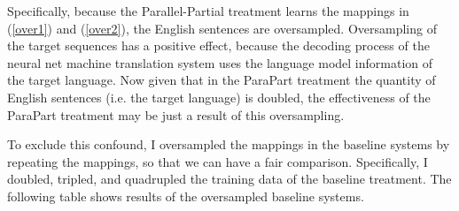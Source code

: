 \documentclass[final]{ua-thesis}
\numberwithin{equation}{section}
\begin{document}
Specifically, because the Parallel-Partial treatment learns the mappings in (\ref{over1}) and (\ref{over2}), the English sentences are oversampled. Oversampling of the target sequences has a positive effect, because the decoding process of the neural net machine translation system uses the language model information of the target language. Now given that in the ParaPart treatment the quantity of English sentences (i.e. the target language) is doubled, the effectiveness of the ParaPart treatment may be just a result of this oversampling.   

To exclude this confound, I oversampled the mappings in the baseline systems by repeating the mappings, so that we can have a fair comparison. Specifically, I doubled, tripled, and quadrupled the training data of the baseline treatment. The following table shows results of the oversampled baseline systems. 
\end{document}
